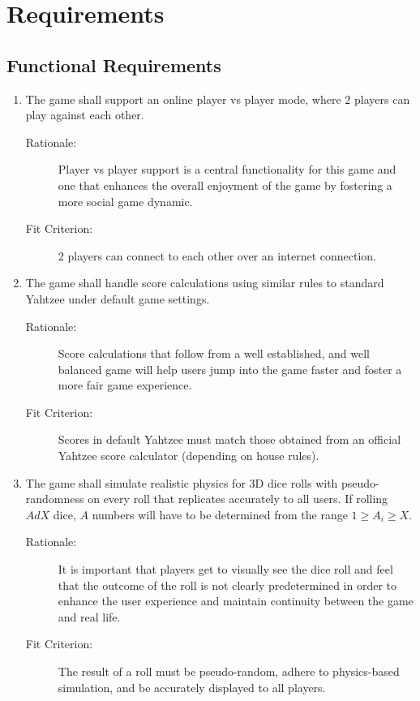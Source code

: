 \section{Requirements}

\subsection{Functional Requirements}

\begin{enumerate}[label=R\arabic*, start=1, left=0pt]

    \item \label{R1} The game shall support an online player vs player mode, where 2 players can play against each other.
    \begin{description}
        \item[Rationale:] Player vs player support is a central functionality for this game and one that enhances the overall enjoyment of the game by fostering a more social game dynamic.
        \item[Fit Criterion:] 2 players can connect to each other over an internet connection.
    \end{description}

    \item \label{R2} The game shall handle score calculations using similar rules to standard Yahtzee under default game settings.
    \begin{description}
        \item[Rationale:] Score calculations that follow from a well established, and well balanced game will help users jump into the game faster and foster a more fair game experience.
        \item[Fit Criterion:] Scores in default Yahtzee must match those obtained from an official Yahtzee score calculator (depending on house rules).
    \end{description}

    \item \label{R3} The game shall simulate realistic physics for 3D dice rolls with pseudo-randomness on every roll that replicates accurately to all users. If rolling $AdX$ dice, $A$ numbers will have to be determined from the range $1 \geq A_{i} \geq X$.
    \begin{description}
        \item[Rationale:] It is important that players get to visually see the dice roll and feel that the outcome of the roll is not clearly predetermined in order to enhance the user experience and maintain continuity between the game and real life.
        \item[Fit Criterion:] The result of a roll must be pseudo-random, adhere to physics-based simulation, and be accurately displayed to all players.
    \end{description}


\end{enumerate}
